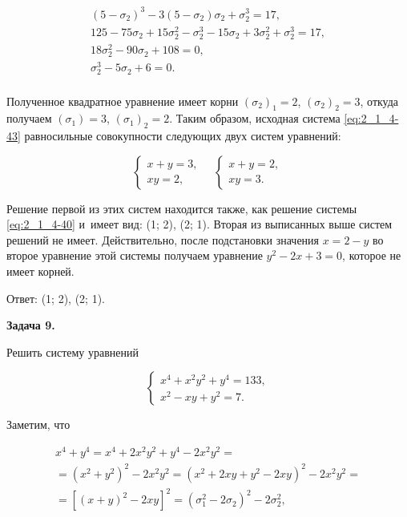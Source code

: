 \begin{gather*}
(5 - \sigma_{2})^{3} - 3(5 - \sigma_{2})\sigma_{2} + \sigma_{2}^{3} = 17, \\
125 - 75\sigma_{2} + 15\sigma_{2}^{2} - \sigma_{2}^{3}
- 15\sigma_{2} + 3\sigma_{2}^{2} + \sigma_{2}^3 = 17, \\
18\sigma_{2}^{2} - 90\sigma_{2} +108 = 0,\\
\sigma_{2}^{3} - 5\sigma_{2} + 6 = 0. \\
\end{gather*}

Полученное квадратное уравнение имеет корни $(\sigma_{2})_{1} = 2$,
$(\sigma_{2})_{2} = 3$, откуда получаем $(\sigma_{1}) = 3$, $(\sigma_{1})_{2} = 2$.
Таким образом, исходная система \eqref{eq:2_1_4-43} равносильные совокупности
следующих двух систем уравнений:

\begin{equation*}
\begin{cases}
x + y = 3, \\
xy = 2,
\end{cases}
\quad
\begin{cases}
x + y = 2, \\
xy = 3.
\end{cases}
\end{equation*}

Решение первой из этих систем находится также, как решение системы \eqref{eq:2_1_4-40}
и~имеет вид: (1; 2), (2; 1). Вторая из выписанных выше систем решений не имеет.
Действительно, после подстановки значения $x = 2 - y$ во второе уравнение
этой системы получаем уравнение $y^{2} - 2x + 3 = 0$, которое не имеет корней.

Ответ: (1; 2), (2; 1).

\hypertarget{ex:2_1_4_9}{\textbf{Задача 9.}} Решить систему уравнений

\begin{equation}\label{eq:2_1_4-45}
\begin{cases}
x^{4} + x^{2}y^{2} + y^{4} = 133, \\
x^{2} - xy + y^{2} = 7.
\end{cases}
\end{equation}

Заметим, что

\begin{multline*}
x^{4} + y^{4} = 
x^{4} + 2x^{2}y^{2} + y^{4} - 2x^{2}y^{2} = \\
= (x^{2} + y^{2})^{2} - 2x^{2}y^{2} = 
(x^{2} + 2xy + y^{2} - 2xy)^{2} - 2x^{2}y^{2} = \\
= \left[
(x + y)^{2} - 2xy
\right]^{2} =
(\sigma_{1}^{2} - 2\sigma_{2})^{2} - 2\sigma_{2}^{2},
\end{multline*}

